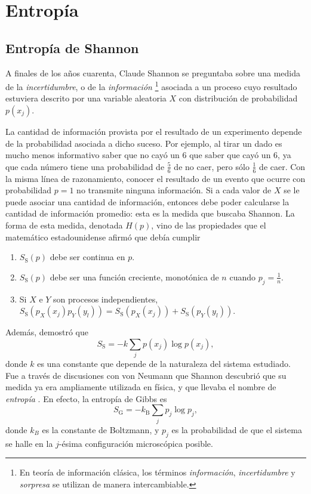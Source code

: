 \section{Entropía}
\subsection{Entropía de Shannon}
A finales de los años cuarenta, Claude Shannon se preguntaba sobre una medida de la \textit{incertidumbre}, o de la \textit{información} \footnote{En teoría de información clásica, los términos \textit{información}, \textit{incertidumbre} y \textit{sorpresa} se utilizan de manera intercambiable.} asociada a un proceso cuyo resultado estuviera descrito por una variable aleatoria $X$ con distribución de probabilidad $p(x_{j})$.


La cantidad de información provista por el resultado de un experimento depende de la probabilidad asociada a dicho suceso. Por ejemplo, al tirar un dado es mucho menos informativo saber que no cayó un $6$ que saber que cayó un $6$, ya que cada número tiene una probabilidad de $\frac{5}{6}$ de no caer, pero sólo $\frac{1}{6}$ de caer. Con la misma línea de razonamiento, conocer el resultado de un evento que ocurre con probabilidad $p=1$ no transmite ninguna información. Si a cada valor de $X$ se le puede asociar una cantidad de información, entonces debe poder calcularse la cantidad de información promedio: esta es la medida que buscaba Shannon. La forma de esta medida, denotada $H(p)$, vino de las propiedades que el matemático estadounidense afirmó que debía cumplir \cite{Shannon,Wilde}
\begin{enumerate}
    \item $S_{\text{S}}(p)$ debe ser continua en $p$.
    \item $S_{\text{S}}(p)$ debe ser una función creciente, monotónica de $n$ cuando $p_{j}=\frac{1}{n}$.
    \item Si $X$ e $Y$ son procesos independientes, $S_{\text{S}}(p_{X}(x_{j})p_{Y}(y_{l}))=S_{\text{S}}(p_{X}(x_{j}))+S_{\text{S}}(p_{Y}(y_{l}))$.
\end{enumerate}
Además, demostró que
\begin{equation}\label{eq:ShannonEntropy}
    S_{\text{S}}=-k\sum_{j}p(x_{j})\log{p(x_{j})},
\end{equation}
donde $k$ es una constante que depende de la naturaleza del sistema estudiado. Fue a través de discusiones con von Neumann que Shannon descubrió que su medida ya era ampliamente utilizada en física, y que llevaba el nombre de \textit{entropía} \cite{McIrvine}. En efecto, la entropía de Gibbs es
\begin{equation}\label{eq:GibbsEntropy}
    S_{\text{G}}=-k_{\text{B}}\sum_{j}p_{j}\log{p_{j}},
\end{equation}
donde $k_{B}$ es la constante de Boltzmann, y $p_{j}$ es la probabilidad de que el sistema se halle en la $j$-ésima configuración microscópica posible.

